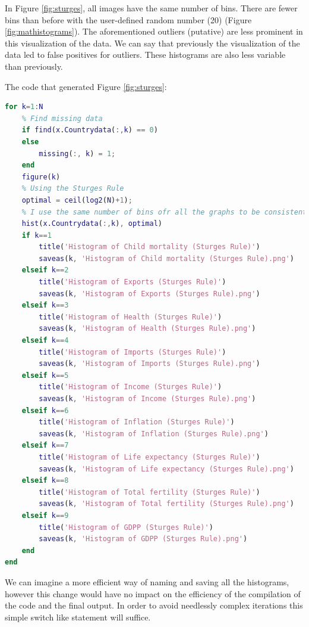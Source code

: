 \documentclass[12pt, a4paper]{article}
\begin{document}
In Figure \ref{fig:sturges}, all images have the same number of bins. There are fewer bins than before with the user-defined random number (20) (Figure \ref{fig:mathistograms}). The aforementioned outliers (putative) are less prominent in this visualization of the data. We can say that previously the visualization of the data led to false positives for outliers. These histograms are also less variable than previously.
\newline

The code that generated Figure \ref{fig:sturges}:
\newline

\begin{lstlisting}[language=Matlab, caption=Iterations that create the Sturges rule histograms., label=lst:sturges]
% Once for the optimal bins number
for k=1:N
    % Find missing data
    if find(x.Countrydata(:,k) == 0)
    else
        missing(:, k) = 1;
    end
    figure(k)
    % Using the Sturges Rule
    optimal = ceil(log2(N)+1);
    % I use the same number of bins ofr all the graphs to be consistent
    hist(x.Countrydata(:,k), optimal)
    if k==1
        title('Histogram of Child mortality (Sturges Rule)')
        saveas(k, 'Histogram of Child mortality (Sturges Rule).png')
    elseif k==2
        title('Histogram of Exports (Sturges Rule)') 
        saveas(k, 'Histogram of Exports (Sturges Rule).png')
    elseif k==3
        title('Histogram of Health (Sturges Rule)')
        saveas(k, 'Histogram of Health (Sturges Rule).png')
    elseif k==4
        title('Histogram of Imports (Sturges Rule)')
        saveas(k, 'Histogram of Imports (Sturges Rule).png')
    elseif k==5 
        title('Histogram of Income (Sturges Rule)')
        saveas(k, 'Histogram of Income (Sturges Rule).png')
    elseif k==6
        title('Histogram of Inflation (Sturges Rule)')
        saveas(k, 'Histogram of Inflation (Sturges Rule).png')
    elseif k==7
        title('Histogram of Life expectancy (Sturges Rule)')
        saveas(k, 'Histogram of Life expectancy (Sturges Rule).png')
    elseif k==8
        title('Histogram of Total fertility (Sturges Rule)')
        saveas(k, 'Histogram of Total fertility (Sturges Rule).png')
    elseif k==9
        title('Histogram of GDPP (Sturges Rule)')
        saveas(k, 'Histogram of GDPP (Sturges Rule).png')
    end
end
\end{lstlisting}

We can imagine a more efficient way of naming and saving all the histograms, however this change would have no impact on the efficiency of the compilation of the code and the final output. In order to avoid needlessly complex iterations this simple switch like statement will suffice.
\end{document}
